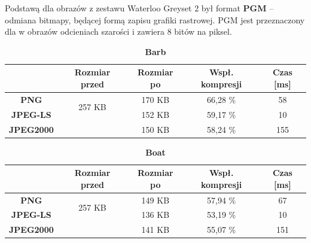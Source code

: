 Podstawą dla obrazów z zestawu Waterloo Greyset 2 był format \textbf{PGM} -- odmiana bitmapy, będącej formą zapisu grafiki rastrowej. PGM jest przeznaczony dla w obrazów odcieniach szarości i zawiera 8 bitów na piksel.

\begin{table}[!h]
	\centering
	\caption{\textbf{Barb}}
	\label{my-label}
	\begin{tabular}{|c|c|c|c|c|}                                             
		\hline
		& \textbf{Rozmiar przed} & \textbf{Rozmiar po} & \textbf{Wspł. kompresji} & \textbf{Czas {[}ms{]}} \\ \hline 
		\textbf{PNG}      &          \multicolumn{1}{c|}{\multirow{2}{*}{257 KB}}             &      170 KB               &    66,28 \%                     &           58                  \\\cline{3-5}
		\textbf{JPEG-LS}  &                        &       152 KB              &        59,17 \%                 &        10                  \\\cline{3-5}
		\textbf{JPEG2000} &                        &     150 KB                &        58,24 \%                 &        155              \\ \hline
	\end{tabular}
\end{table}

\begin{table}[!h]
	\centering
	\caption{\textbf{Boat}}
	\label{my-label}
	\begin{tabular}{|c|c|c|c|c|}                                             
		\hline
		& \textbf{Rozmiar przed} & \textbf{Rozmiar po} & \textbf{Wspł. kompresji} & \textbf{Czas {[}ms{]}} \\ \hline 
		\textbf{PNG}      &          \multicolumn{1}{c|}{\multirow{2}{*}{257 KB}}             &       149 KB              &      57,94 \%                    &           67                  \\\cline{3-5}
		\textbf{JPEG-LS}  &                        &       136 KB              &         53,19 \%                &         10                 \\\cline{3-5}
		\textbf{JPEG2000} &                        &      141 KB               &        55,07 \%                &        151              \\ \hline
	\end{tabular}
\end{table}

